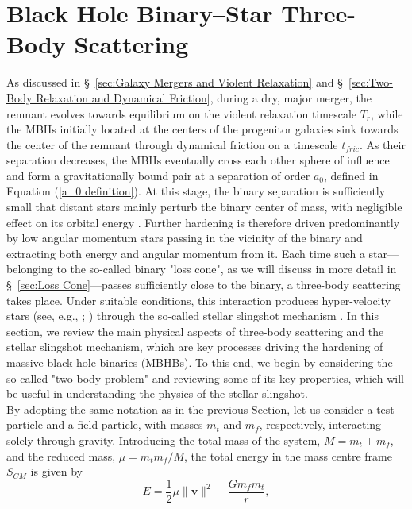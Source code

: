 \documentclass[12pt,twoside,openany]{book}
\begin{document}
\section{Black Hole Binary–Star Three-Body Scattering}\label{sec:Gravitational Slingshot Effect}
As discussed in \S~\ref{sec:Galaxy Mergers and Violent Relaxation} and \S~\ref{sec:Two-Body Relaxation and Dynamical Friction}, during a dry, major merger, the remnant evolves towards equilibrium on the violent relaxation timescale $T_r$, while the MBHs initially located at the centers of the progenitor galaxies sink towards the center of the remnant through dynamical friction on a timescale $t_{fric}$. As their separation decreases, the MBHs eventually cross each other sphere of influence and form a gravitationally bound pair at a separation of order $a_0$, defined in Equation (\ref{a_0 definition}). At this stage, the binary separation is sufficiently small that distant stars mainly perturb the binary center of mass, with negligible effect on its orbital energy \parencite{Quinlan_1996}. Further hardening is therefore driven predominantly by low angular momentum stars passing in the vicinity of the binary and extracting both energy and angular momentum from it. Each time such a star---belonging to the so-called binary "loss cone", as we will discuss in more detail in \S~\ref{sec:Loss Cone}---passes sufficiently close to the binary, a three-body scattering takes place. Under suitable conditions, this interaction produces hyper-velocity stars (see, e.g., \citealt{Quinlan_1996}; \citealt{Sesana_2006}) through the so-called stellar slingshot mechanism \parencite{Mikkola_1992}. In this section, we review the main physical aspects of three-body scattering and the stellar slingshot mechanism, which are key processes driving the hardening of massive black-hole binaries (MBHBs). To this end, we begin by considering the so-called "two-body problem" and reviewing some of its key properties, which will be useful in understanding the physics of the stellar slingshot.\\By adopting the same notation as in the previous Section, let us consider a test particle and a field particle, with masses $m_t$ and $m_f$, respectively, interacting solely through gravity. Introducing the total mass of the system, $M=m_t+m_f$, and the reduced mass, $\mu=m_tm_f/M$, the total energy in the mass centre frame $S_{CM}$ is given by
\begin{equation}
\label{E_in_S_cm}
    E=\frac{1}{2}\mu\|\mathbf{v}\|^2-\frac{Gm_fm_t}{r},
\end{equation}
\end{document}
